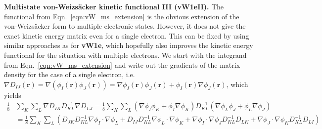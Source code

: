 \documentclass[journal=jacsat,manuscript=article]{achemso}
\renewcommand\vec[1]{\mathbf{#1}}
\begin{document}
\textbf{Multistate von-Weizs\"{a}cker kinetic functional III (vW1eII). \label{sec:vW1eII}}
The functional from Eqn.~\ref{eqn:vW_ms_extension} is the obvious extension of the von-Weizs\"{a}cker form to multiple electronic states.
However, it does not give the exact kinetic energy matrix even for a single electron. This can be fixed by using similar approaches as for \textbf{vW1e},
which hopefully also improves the kinetic energy functional for the situation with multiple electrons.
We start with the integrand from Eqn.~\ref{eqn:vW_ms_extension} and write out the gradients of the matrix density
for the case of a single electron, i.e. $\nabla D_{IJ}(\vec{r}) = \nabla (\phi_I(\vec{r}) \phi_J(\vec{r})) = \nabla \phi_I(\vec{r}) \phi_J(\vec{r}) + \phi_I(\vec{r}) \nabla \phi_J(\vec{r})$, which yields
\begin{align}
  \frac{1}{8} & \sum_K \sum_L \nabla D_{IK} D^{-1}_{KL} \nabla D_{LJ} = \frac{1}{8} \sum_K \sum_L \left(\nabla \phi_I \phi_K + \phi_I \nabla \phi_K \right) D^{-1}_{KL} \left(\nabla \phi_L \phi_J + \phi_L \nabla \phi_J \right) \\
  &= \frac{1}{8} \sum_K \sum_L \left( D_{JK} D^{-1}_{KL} \nabla \phi_I \cdot \nabla \phi_L + D_{IJ} D^{-1}_{KL} \nabla \phi_L \cdot \nabla \phi_K + \nabla \phi_I \cdot \nabla \phi_J D^{-1}_{KL} D_{LK} + \nabla \phi_J \cdot \nabla \phi_K D^{-1}_{KL} D_{LI} \right)
\end{align}
\end{document}
